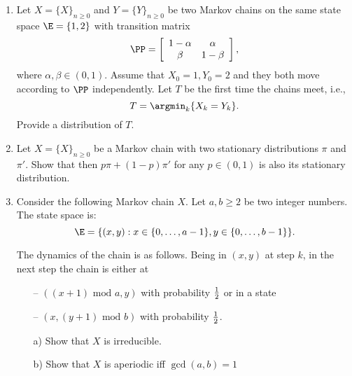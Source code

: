 \documentclass[a4paper,12pt]{article}
\begin{document}
\begin{enumerate}
\item

Let $X=\{X\}_{n\geq 0}$ and $Y=\{Y\}_{n\geq 0}$ be two Markov chains 
on the same state space  $\E=\{1,2\}$ with transition matrix
$$\PP=\left[
\begin{array}{ccccccccc}
1-\alpha & \alpha \\
\beta & 1-\beta \\
\end{array}\right],$$
where $\alpha,\beta\in(0,1)$. Assume that  $X_0=1, Y_0=2$ and they both move according to $\PP$ independently.
Let $T$ be the first time the chains meet, i.e., 
$$T=\argmin_{k}\{X_k=Y_k\}.$$
Provide a distribution of $T$.



\item 
Let   $X=\{X\}_{n\geq 0}$ be a Markov chain with two 
stationary distributions  $\pi$ and $\pi'$. Show that then
$p\pi+(1-p)\pi'$ for any $p\in(0,1)$ is also its stationary distribution.

\item Consider the following Markov chain $X$. Let 
$a,b\geq 2$ be two integer numbers. The state space is:
    $$\E=\{(x,y) : x\in\{0,\ldots, a-1\}, y\in\{0,\ldots,b-1\}\}.$$
     
   The dynamics of the chain is as follows. Being in $(x,y)$ at step  $k$,  in the next step the 
   chain is either at
   \begin{itemize}
    \item[--]
    $((x+1) \textrm{ mod } a,y)$ with probability  ${1\over 2}$ or in a state
    \item[--] 
    $(x,(y+1) \textrm{ mod } b)$ with probability ${1\over 2}$.
    
   \end{itemize}

\begin{itemize}
 \item[a)] Show that $X$ is irreducible.
 \item[b)] Show that $X$ is aperiodic iff $\gcd(a,b)=1$
\end{itemize}
  
\end{enumerate}
 
\end{document}

